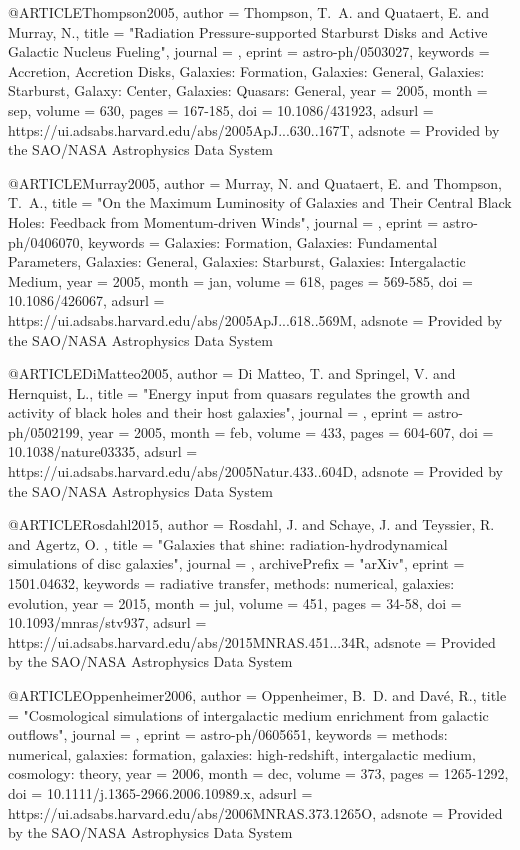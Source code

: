 \documentclass[useAMS,usenatbib]{mnras}
\begin{document}
{{{{{{{{{{{{{{@ARTICLE{Thompson2005,
   author = {{Thompson}, T.~A. and {Quataert}, E. and {Murray}, N.},
    title = "{Radiation Pressure-supported Starburst Disks and Active Galactic Nucleus Fueling}",
  journal = {\apj},
   eprint = {astro-ph/0503027},
 keywords = {Accretion, Accretion Disks, Galaxies: Formation, Galaxies: General, Galaxies: Starburst, Galaxy: Center, Galaxies: Quasars: General},
     year = 2005,
    month = sep,
   volume = 630,
    pages = {167-185},
      doi = {10.1086/431923},
   adsurl = {https://ui.adsabs.harvard.edu/abs/2005ApJ...630..167T},
  adsnote = {Provided by the SAO/NASA Astrophysics Data System}
}

@ARTICLE{Murray2005,
   author = {{Murray}, N. and {Quataert}, E. and {Thompson}, T.~A.},
    title = "{On the Maximum Luminosity of Galaxies and Their Central Black Holes: Feedback from Momentum-driven Winds}",
  journal = {\apj},
   eprint = {astro-ph/0406070},
 keywords = {Galaxies: Formation, Galaxies: Fundamental Parameters, Galaxies: General, Galaxies: Starburst, Galaxies: Intergalactic Medium},
     year = 2005,
    month = jan,
   volume = 618,
    pages = {569-585},
      doi = {10.1086/426067},
   adsurl = {https://ui.adsabs.harvard.edu/abs/2005ApJ...618..569M},
  adsnote = {Provided by the SAO/NASA Astrophysics Data System}
}

@ARTICLE{DiMatteo2005,
   author = {{Di Matteo}, T. and {Springel}, V. and {Hernquist}, L.},
    title = "{Energy input from quasars regulates the growth and activity of black holes and their host galaxies}",
  journal = {\nat},
   eprint = {astro-ph/0502199},
     year = 2005,
    month = feb,
   volume = 433,
    pages = {604-607},
      doi = {10.1038/nature03335},
   adsurl = {https://ui.adsabs.harvard.edu/abs/2005Natur.433..604D},
  adsnote = {Provided by the SAO/NASA Astrophysics Data System}
}

@ARTICLE{Rosdahl2015,
   author = {{Rosdahl}, J. and {Schaye}, J. and {Teyssier}, R. and {Agertz}, O.
	},
    title = "{Galaxies that shine: radiation-hydrodynamical simulations of disc galaxies}",
  journal = {\mnras},
archivePrefix = "arXiv",
   eprint = {1501.04632},
 keywords = {radiative transfer, methods: numerical, galaxies: evolution},
     year = 2015,
    month = jul,
   volume = 451,
    pages = {34-58},
      doi = {10.1093/mnras/stv937},
   adsurl = {https://ui.adsabs.harvard.edu/abs/2015MNRAS.451...34R},
  adsnote = {Provided by the SAO/NASA Astrophysics Data System}
}

@ARTICLE{Oppenheimer2006,
   author = {{Oppenheimer}, B.~D. and {Dav{\'e}}, R.},
    title = "{Cosmological simulations of intergalactic medium enrichment from galactic outflows}",
  journal = {\mnras},
   eprint = {astro-ph/0605651},
 keywords = {methods: numerical, galaxies: formation, galaxies: high-redshift, intergalactic medium, cosmology: theory},
     year = 2006,
    month = dec,
   volume = 373,
    pages = {1265-1292},
      doi = {10.1111/j.1365-2966.2006.10989.x},
   adsurl = {https://ui.adsabs.harvard.edu/abs/2006MNRAS.373.1265O},
  adsnote = {Provided by the SAO/NASA Astrophysics Data System}
}

}}}}}}}}}}}}}}
\end{document}
